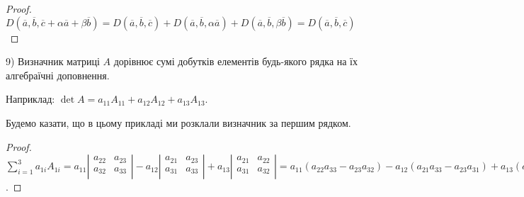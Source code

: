 \begin{proof}
	$D(\overline{a}, \overline{b}, \overline{c} + \alpha\overline{a} + \beta\overline{b}) = D(\overline{a}, \overline{b}, \overline{c}) + D(\overline{a}, \overline{b}, \alpha\overline{a}) + D(\overline{a}, \overline{b}, \beta\overline{b}) = D(\overline{a}, \overline{b}, \overline{c})$
\end{proof}
	
9) Визначник матриці $A$ дорівнює сумі добутків елементів будь-якого рядка на їх
алгебраїчні доповнення. 
	
Наприклад: $\det A = a_{11}A_{11} + a_{12}A_{12} + a_{13}A_{13}$.

Будемо казати, що в цьому прикладі ми розклали визначник за першим рядком.

\begin{proof}
	$\sum\limits_{i=1}^3 a_{1i}A_{1i}
	= a_{11}\left|\begin{matrix}
		a_{22} & a_{23} \\
		a_{32} & a_{33} \\
	\end{matrix} \right|
	- a_{12}\left|\begin{matrix}
		a_{21} & a_{23} \\
		a_{31} & a_{33} \\
	\end{matrix} \right|
	+ a_{13}\left|\begin{matrix}
		a_{21} & a_{22} \\
		a_{31} & a_{32} \\
	\end{matrix} \right|
	= a_{11}(a_{22}a_{33} - a_{23}a_{32})
	- a_{12}(a_{21}a_{33} - a_{23}a_{31})
	+ a_{13}(a_{21}a_{32} - a_{22}a_{31})
	= a_{11}a_{22}a_{33} - a_{11}a_{23}a_{32} - a_{12}a_{21}a_{33}
	+ a_{12}a_{23}a_{31} + a_{13}a_{21}a_{32} - a_{11}a_{22}a_{31}
	= \det A$.
\end{proof}

